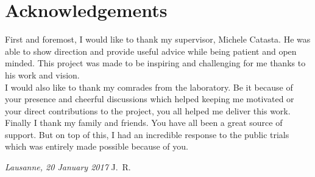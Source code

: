 \chapter*{Acknowledgements}
First and foremost, I would like to thank my supervisor, Michele Catasta. He was able to show direction and provide useful advice while being patient and open minded. This project was made to be inspiring and challenging for me thanks to his work and vision.\\
I would also like to thank my comrades from the laboratory. Be it because of your presence and cheerful discussions which helped keeping me motivated or your direct contributions to the project, you all helped me deliver this work.\\
Finally I thank my family and friends. You have all been a great source of support. But on top of this, I had an incredible response to the public trials which was entirely made possible because of you.

\bigskip
 
\noindent\textit{Lausanne, 20 January 2017}
\hfill J.~R.